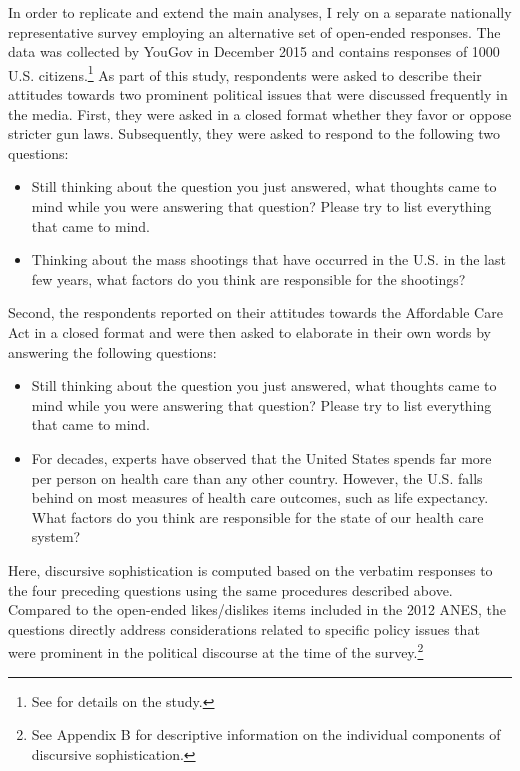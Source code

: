 \documentclass[12pt]{article}
\begin{document}
In order to replicate and extend the main analyses, I rely on a separate nationally representative survey employing an alternative set of open-ended responses. The data was collected by YouGov in December 2015 and contains responses of 1000 U.S. citizens.\footnote{See \citet{clifford2016cheating} for details on the study.} As part of this study, respondents were asked to describe their attitudes towards two prominent political issues that were discussed frequently in the media. First, they were asked in a closed format whether they favor or oppose stricter gun laws. Subsequently, they were asked to respond to the following two questions:
\begin{itemize}\setlength\itemsep{0em}
\item Still thinking about the question you just answered, what thoughts came to mind while you were answering that question? Please try to list everything that came to mind.
\item Thinking about the mass shootings that have occurred in the U.S. in the last few years, what factors do you think are responsible for the shootings?
\end{itemize}
Second, the respondents reported on their attitudes towards the Affordable Care Act in a closed format and were then asked to elaborate in their own words by answering the following questions:
\begin{itemize}\setlength\itemsep{0em}
\item Still thinking about the question you just answered, what thoughts came to mind while you were answering that question? Please try to list everything that came to mind.
\item For decades, experts have observed that the United States spends far more per person on health care than any other country. However, the U.S. falls behind on most measures of health care outcomes, such as life expectancy. What factors do you think are responsible for the state of our health care system?
\end{itemize}
Here, discursive sophistication is computed based on the verbatim responses to the four preceding questions using the same procedures described above. Compared to the open-ended likes/dislikes items included in the 2012 ANES, the questions directly address considerations related to specific policy issues that were prominent in the political discourse at the time of the survey.\footnote{See Appendix B for descriptive information on the individual components of discursive sophistication.}
\end{document}
